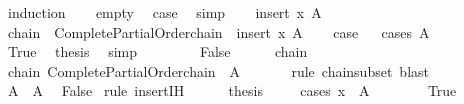 \begin{isabellebody}
\isamarkupfalse%
\ induction\isanewline
\ \ \isamarkupfalse%
\ empty\ \isamarkupfalse%
\ {\isacharquery}{\kern0pt}case\ \isamarkupfalse%
\ simp\isanewline
{}\isamarkupfalse%
\isanewline
\ \ \isamarkupfalse%
\ {\isacharparenleft}{\kern0pt}insert\ x\ A{\isacharparenright}{\kern0pt}\isanewline
\ \ \isamarkupfalse%
\ chain\ {\isacharequal}{\kern0pt}\ {\isacartoucheopen}Complete{\isacharunderscore}{\kern0pt}Partial{\isacharunderscore}{\kern0pt}Order{\isachardot}{\kern0pt}chain\ {\isacharparenleft}{\kern0pt}{\isasymle}{\isacharparenright}{\kern0pt}\ {\isacharparenleft}{\kern0pt}insert\ x\ A{\isacharparenright}{\kern0pt}{\isacartoucheclose}\isanewline
\ \ \isamarkupfalse%
\ {\isacharquery}{\kern0pt}case\isanewline
\ \ \isamarkupfalse%
{\isacharparenleft}{\kern0pt}cases\ {\isachardoublequoteopen}A\ {\isacharequal}{\kern0pt}\ {\isacharbraceleft}{\kern0pt}{\isacharbraceright}{\kern0pt}{\isachardoublequoteclose}{\isacharparenright}{\kern0pt}\isanewline
\ \ \ \ \isamarkupfalse%
\ True\ \isamarkupfalse%
\ {\isacharquery}{\kern0pt}thesis\ \isamarkupfalse%
\ simp\isanewline
\ \ \isamarkupfalse%
\isanewline
\ \ \ \ \isamarkupfalse%
\ False\isanewline
\ \ \ \ \isamarkupfalse%
\ chain\ \isamarkupfalse%
\ chain{\isacharprime}{\kern0pt}{\isacharcolon}{\kern0pt}\ {\isachardoublequoteopen}Complete{\isacharunderscore}{\kern0pt}Partial{\isacharunderscore}{\kern0pt}Order{\isachardot}{\kern0pt}chain\ {\isacharparenleft}{\kern0pt}{\isasymle}{\isacharparenright}{\kern0pt}\ A{\isachardoublequoteclose}\isanewline
\ \ \ \ \ \ \isamarkupfalse%
{\isacharparenleft}{\kern0pt}rule\ chain{\isacharunderscore}{\kern0pt}subset{\isacharparenright}{\kern0pt}\ blast\isanewline
\ \ \ \ \isamarkupfalse%
\ {\isachardoublequoteopen}{\isasymSqunion}A\ {\isasymin}\ A{\isachardoublequoteclose}\ \isamarkupfalse%
\ False\ \isamarkupfalse%
{\isacharparenleft}{\kern0pt}rule\ insert{\isachardot}{\kern0pt}IH{\isacharparenright}{\kern0pt}\isanewline
\ \ \ \ \isamarkupfalse%
\ {\isacharquery}{\kern0pt}thesis\isanewline
\ \ \ \ \isamarkupfalse%
{\isacharparenleft}{\kern0pt}cases\ {\isachardoublequoteopen}x\ {\isasymle}\ {\isasymSqunion}A{\isachardoublequoteclose}{\isacharparenright}{\kern0pt}\isanewline
\ \ \ \ \ \ \isamarkupfalse%
\ True\isanewline

\end{isabellebody}
